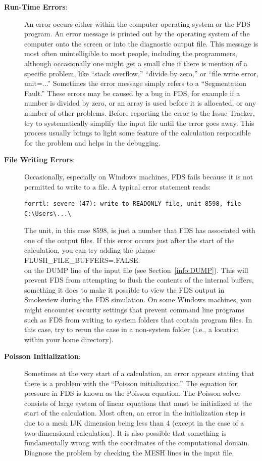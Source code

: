 \documentclass[11pt]{book}
\begin{document}
\begin{description}
\item[{\bf Run-Time Errors}:] An error occurs either within the computer operating system or the FDS program. An error message is printed out by the operating system of the computer onto the screen or into the diagnostic output file. This message is most often unintelligible to most people, including the programmers, although occasionally one might get a small clue if there is mention of a specific problem, like ``stack overflow,'' ``divide by zero,'' or ``file write error, unit=...'' Sometimes the error message simply refers to a ``Segmentation Fault.'' These errors may be caused by a bug in FDS, for example if a number is divided by zero, or an array is used before it is allocated, or any number of other problems. Before reporting the error to the Issue Tracker, try to systematically simplify the input file until the error goes away. This process usually brings to light some feature of the calculation responsible for the problem and helps in the debugging.
\item[{\bf File Writing Errors}:] Occasionally, especially on Windows machines, FDS fails because it is not permitted to write to a file. A typical error statement reads:
\begin{lstlisting}
forrtl: severe (47): write to READONLY file, unit 8598, file C:\Users\...\
\end{lstlisting}
 The unit, in this case 8598, is just a number that FDS has associated with one of the output files. If this error occurs just after the start of the calculation, you can try adding the phrase \\ {\ct FLUSH\_FILE\_BUFFERS=.FALSE.} \\ on the {\ct DUMP} line of the input file (see Section~\ref{info:DUMP}). This will prevent FDS from attempting to flush the contents of the internal buffers, something it does to make it possible to view the FDS output in Smokeview during the FDS simulation. On some Windows machines, you might encounter security settings that prevent command line programs such as FDS from writing to system folders that contain program files. In this case, try to rerun the case in a non-system folder (i.e., a location within your home directory).
\item[{\bf Poisson Initialization}:] Sometimes at the very start of a calculation, an error appears stating that there is a problem with the ``Poisson initialization.'' The equation for pressure in FDS is known as the Poisson equation. The Poisson solver consists of large system of linear equations that must be initialized at the start of the calculation. Most often, an error in the initialization step is due to a mesh {\ct IJK} dimension being less than 4 (except in the case of a two-dimensional calculation). It is also possible that something is fundamentally wrong with the coordinates of the computational domain. Diagnose the problem by checking the {\ct MESH} lines in the input file.
\end{description}
\end{document}
